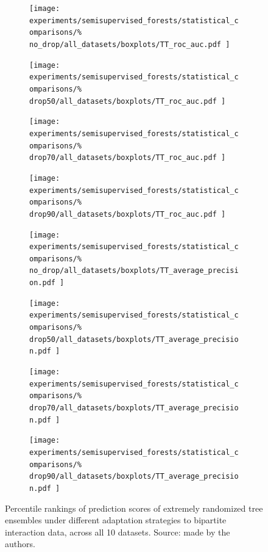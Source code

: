 \begin{figure}[tb]
    \begin{subfigure}{0.24\textwidth}
        \texttt{[image: 
            experiments/semisupervised\_forests/statistical\_comparisons/\%
            no\_drop/all\_datasets/boxplots/TT\_roc\_auc.pdf
        ]}
    \end{subfigure}
    \begin{subfigure}{0.24\textwidth}
        \texttt{[image: 
            experiments/semisupervised\_forests/statistical\_comparisons/\%
            drop50/all\_datasets/boxplots/TT\_roc\_auc.pdf
        ]}
    \end{subfigure}
    \begin{subfigure}{0.24\textwidth}
        \texttt{[image: 
            experiments/semisupervised\_forests/statistical\_comparisons/\%
            drop70/all\_datasets/boxplots/TT\_roc\_auc.pdf
        ]}
    \end{subfigure}
    \begin{subfigure}{0.24\textwidth}
        \texttt{[image: 
            experiments/semisupervised\_forests/statistical\_comparisons/\%
            drop90/all\_datasets/boxplots/TT\_roc\_auc.pdf
        ]}
    \end{subfigure}

    \begin{subfigure}{0.24\textwidth}
        \texttt{[image: 
            experiments/semisupervised\_forests/statistical\_comparisons/\%
            no\_drop/all\_datasets/boxplots/TT\_average\_precision.pdf
        ]}
    \end{subfigure}
    \begin{subfigure}{0.24\textwidth}
        \texttt{[image: 
            experiments/semisupervised\_forests/statistical\_comparisons/\%
            drop50/all\_datasets/boxplots/TT\_average\_precision.pdf
        ]}
    \end{subfigure}
    \begin{subfigure}{0.24\textwidth}
        \texttt{[image: 
            experiments/semisupervised\_forests/statistical\_comparisons/\%
            drop70/all\_datasets/boxplots/TT\_average\_precision.pdf
        ]}
    \end{subfigure}
    \begin{subfigure}{0.24\textwidth}
        \texttt{[image: 
            experiments/semisupervised\_forests/statistical\_comparisons/\%
            drop90/all\_datasets/boxplots/TT\_average\_precision.pdf
        ]}
    \end{subfigure}

    \caption{
        Percentile rankings of prediction scores of extremely randomized tree ensembles under different adaptation strategies to bipartite interaction data, across all 10 datasets. Source: made by the authors.
    }
    \label{fig:ss_comparison}
\end{figure}


